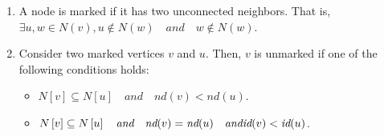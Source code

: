\begin{enumerate}
	\item A node is marked if it has two unconnected neighbors. That is, $\exists u, w \in N(v), u \notin N(w)  \quad \textit{and} \quad w \notin N(w)$.
	\item Consider two marked vertices $v$ and $u$. Then, $v$ is unmarked if one of the following conditions holds:
	\begin{itemize}
		\item $N\left[v\right] \subseteq N\left[u\right] \quad \textit{and} \quad \textit{nd}(v) < \textit{nd}(u)$.
		\item $N\left[v\right] \subseteq N\left[u\right] \quad \textit{and} \quad \textit{nd}(v) = \textit{nd}(u) \quad \textit{and} \quad \\ \textit{id}(v) < \textit{id}(u)$.
	\end{itemize}
	
\end{enumerate} 





